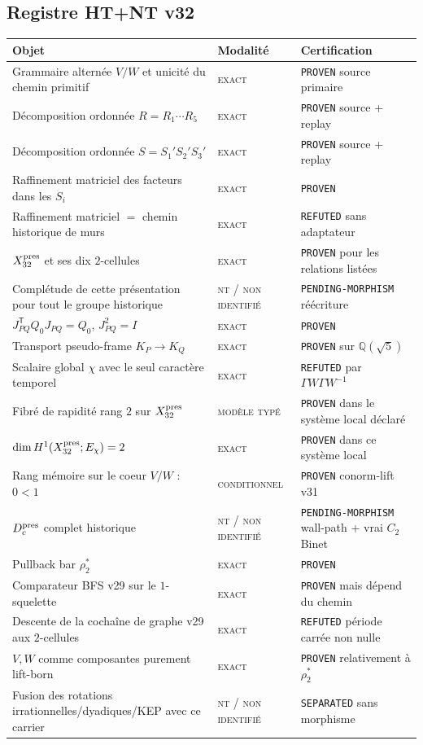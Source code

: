 \documentclass[11pt,a4paper]{article}
\newcommand{\statusExact}{\textsc{exact}}
\newcommand{\statusCond}{\textsc{conditionnel}}
\newcommand{\statusTyped}{\textsc{modèle typé}}
\newcommand{\statusNT}{\textsc{nt / non identifié}}
\newcommand{\certProven}{\texttt{PROVEN}}
\newcommand{\certRefuted}{\texttt{REFUTED}}
\newcommand{\certSeparated}{\texttt{SEPARATED}}
\newcommand{\certPending}{\texttt{PENDING-MORPHISM}}
\begin{document}
\subsection{Registre HT+NT v32}

\begin{longtable}{p{}p{}p{}}
\toprule
Objet & Modalité & Certification\\
\midrule
\endhead
Grammaire alternée $V/W$ et unicité du chemin primitif & \statusExact & \certProven{} source primaire\\
Décomposition ordonnée $R=R_1\cdots R_5$ & \statusExact & \certProven{} source + replay\\
Décomposition ordonnée $S=S_1'S_2'S_3'$ & \statusExact & \certProven{} source + replay\\
Raffinement matriciel des facteurs dans les $S_i$ & \statusExact & \certProven\\
Raffinement matriciel $=$ chemin historique de murs & \statusExact & \certRefuted{} sans adaptateur\\
$X_{32}^{\rm pres}$ et ses dix $2$-cellules & \statusExact & \certProven{} pour les relations listées\\
Complétude de cette présentation pour tout le groupe historique & \statusNT & \certPending{} réécriture\\
$J_{PQ}^{\mathsf T}Q_0J_{PQ}=Q_0$, $J_{PQ}^2=I$ & \statusExact & \certProven\\
Transport pseudo-frame $K_P\to K_Q$ & \statusExact & \certProven{} sur $\mathbb Q(\sqrt5)$\\
Scalaire global $\chi$ avec le seul caractère temporel & \statusExact & \certRefuted{} par $\Gamma W\Gamma W^{-1}$\\
Fibré de rapidité rang $2$ sur $X_{32}^{\rm pres}$ & \statusTyped & \certProven{} dans le système local déclaré\\
$\dim H^1(X_{32}^{\rm pres};E_\chi)=2$ & \statusExact & \certProven{} dans ce système local\\
Rang mémoire sur le coeur $V/W$ : $0<1$ & \statusCond & \certProven{} conorm-lift v31\\
$D_c^{\rm pres}$ complet historique & \statusNT & \certPending{} wall-path + vrai $C_2$ Binet\\
Pullback bar $\rho_2^*$ & \statusExact & \certProven\\
Comparateur BFS v29 sur le $1$-squelette & \statusExact & \certProven{} mais dépend du chemin\\
Descente de la cochaîne de graphe v29 aux $2$-cellules & \statusExact & \certRefuted{} période carrée non nulle\\
$V,W$ comme composantes purement lift-born & \statusExact & \certProven{} relativement à $\rho_2^*$\\
Fusion des rotations irrationnelles/dyadiques/KEP avec ce carrier & \statusNT & \certSeparated{} sans morphisme\\
\bottomrule
\end{longtable}
\end{document}
